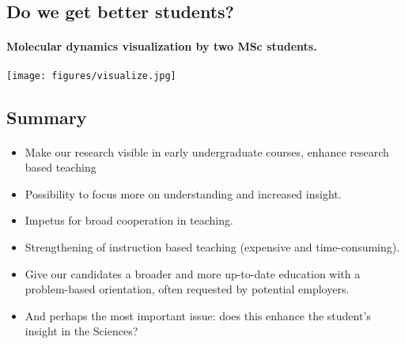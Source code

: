\documentclass[%
twoside,                 %
final,                   %
10pt]{article}
\begin{document}
\noindent




\subsection*{Do we get better students?}

\paragraph{Molecular dynamics visualization by two MSc students.}


\centerline{\texttt{[image: figures/visualize.jpg]}}







\subsection*{Summary}

\paragraph{}

\begin{itemize}
\item Make our research visible in early undergraduate courses, enhance research based teaching

\item Possibility to focus more on understanding and increased insight.

\item Impetus for broad cooperation in teaching.

\item Strengthening of instruction based teaching (expensive and time-consuming).

\item Give our candidates a broader and more up-to-date education with a problem-based orientation, often requested by potential employers.

\item And perhaps the most important issue: does this enhance the student's insight in the Sciences?
\end{itemize}

\noindent






\printindex
\end{document}
